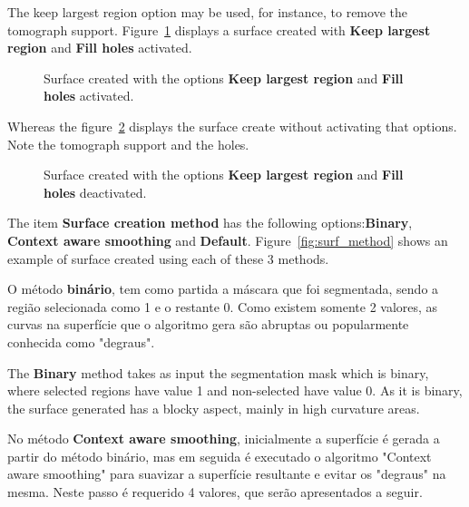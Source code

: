 The keep largest region option may be used, for instance, to remove the tomograph support. Figure~\ref{fig:surface_ex1} displays a surface created with \textbf{Keep largest region} and \textbf{Fill holes} activated. 

\begin{figure}[!htb]
  \centering
  \caption{Surface created with the options \textbf{Keep largest region} and \textbf{Fill holes} activated.}
  \label{fig:surface_ex1}
\end{figure}

Whereas the figure~\ref{fig:surface_ex2} displays the surface create without activating that options. Note the tomograph support and the holes.

\begin{figure}
  \centering
  \caption{Surface created with the options \textbf{Keep largest region} and \textbf{Fill holes} deactivated.}
  \label{fig:surface_ex2}
\end{figure}

The item \textbf{Surface creation method} has the following options:\textbf{Binary}, \textbf{Context aware smoothing} and \textbf{Default}. Figure~\ref{fig:surf_method} shows an example of surface created using each of these 3 methods.

O método \textbf{binário}, tem como partida a máscara que foi segmentada, sendo a região selecionada como 1 e o restante 0. Como existem somente 2 valores, as curvas na superfície que o algoritmo gera são abruptas ou popularmente conhecida como "degraus".

The \textbf{Binary} method takes as input the segmentation mask which is binary, where selected regions have value 1 and non-selected have value 0. As it is binary, the surface generated has a blocky aspect, mainly in high curvature areas.

No método \textbf{Context aware smoothing}, inicialmente a superfície é gerada a partir do método binário, mas em seguida é executado o algoritmo "Context aware smoothing" para suavizar a superfície resultante e evitar os "degraus" na mesma. Neste passo é requerido 4 valores, que serão apresentados a seguir.

